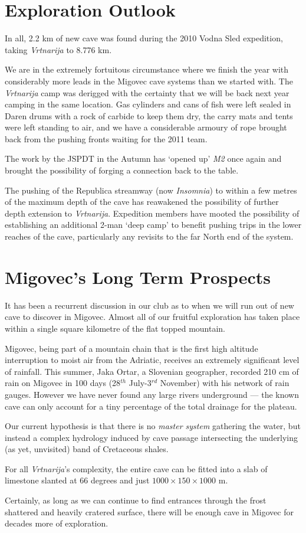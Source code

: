 
\section{Exploration Outlook}

In all, 2.2 km of new cave was found during the 2010 Vodna Sled
expedition, taking \emph{Vrtnarija} to 8.776 km.

We are in the extremely fortuitous circumstance where we finish the year
with considerably more leads in the Migovec cave systems than we started
with. The \emph{Vrtnarija} camp was derigged with the certainty that we
will be back next year camping in the same location. Gas cylinders and
cans of fish were left sealed in Daren drums with a rock of carbide to
keep them dry, the carry mats and tents were left standing to air, and
we have a considerable armoury of rope brought back from the pushing
fronts waiting for the 2011 team.

The work by the JSPDT in the Autumn has `opened up' \emph{M2} once again
and brought the possibility of forging a connection back to the table.

The pushing of the Republica streamway (now \emph{Insomnia}) to within a
few metres of the maximum depth of the cave has reawakened the
possibility of further depth extension to \emph{Vrtnarija}. Expedition
members have mooted the possibility of establishing an additional 2-man
`deep camp' to benefit pushing trips in the lower reaches of the cave,
particularly any revisits to the far North end of the system.


\section{Migovec's Long Term
Prospects}

It has been a recurrent discussion in our club as to when we will run
out of new cave to discover in Migovec. Almost all of our fruitful
exploration has taken place within a single square kilometre of the flat
topped mountain.

Migovec, being part of a mountain chain that is the first high altitude
interruption to moist air from the Adriatic, receives an extremely
significant level of rainfall. This summer, Jaka Ortar, a Slovenian
geographer, recorded 210 cm of rain on Migovec in 100 days (28\(^{th}\)
July-3\(^{rd}\) November) with his network of rain gauges. However we
have never found any large rivers underground --- the known cave can
only account for a tiny percentage of the total drainage for the
plateau.

Our current hypothesis is that there is no \textit{master system}
gathering the water, but instead a complex hydrology induced by cave
passage intersecting the underlying (as yet, unvisited) band of
Cretaceous shales.

For all \emph{Vrtnarija}'s complexity, the entire cave can be fitted
into a slab of limestone slanted at 66 degrees and just
\(1000\times150\times1000\) m.

Certainly, as long as we can continue to find entrances through the
frost shattered and heavily cratered surface, there will be enough cave
in Migovec for decades more of exploration.
